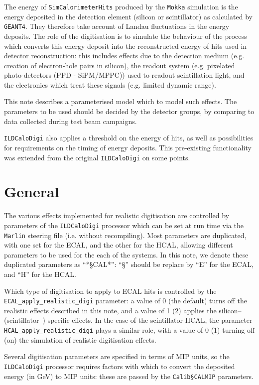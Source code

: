 \documentclass[12pt]{article} %
\begin{document}
The energy of {\tt SimCalorimeterHits} produced by the {\tt Mokka} simulation is the energy deposited in the detection
element (silicon or scintillator) as calculated by {\tt GEANT4}. They therefore take account of Landau fluctuations
in the energy deposits.
The role of the digitisation is to simulate the behaviour of the process which converts this energy deposit into the 
reconstructed energy of hits used in detector reconstruction: this includes effects due to the detection medium
(e.g. creation of electron-hole pairs in silicon), 
the readout system (e.g. pixelated photo-detectors (PPD - SiPM/MPPC)) used to readout scintillation light,
and the electronics which treat these signals (e.g. limited dynamic range).

This note describes a parameterised model which to model such effects. The parameters to be used should be decided by
the detector groups, by comparing to data collected during test beam campaigns.

{\tt ILDCaloDigi} also applies a threshold on the energy of hits, as well as possibilities for requirements on the timing
of energy deposits. This pre-existing functionality was extended from the original {\tt ILDCaloDigi} on some points.

\section{General}

The various effects implemented for realistic digitisation are controlled by parameters of the {\tt ILDCaloDigi}
processor which can be set at run time via the {\tt Marlin} steering file (i.e. without recompiling).
Most parameters are duplicated, with one set for the ECAL, and the other for the HCAL, allowing different
parameters to be used for the each of the systems. In this note, we denote these duplicated parameters as ``*\S CAL*'':
``\S'' should be replace by ``E'' for the ECAL, and ``H'' for the HCAL.

Which type of digitisation to apply to ECAL hits is controlled by the {\tt ECAL\_apply\_realistic\_digi} parameter: a value of
0 (the default) turns off the realistic effects described in this note, and a value of 1 (2) applies the silicon--
(scintillator--) specific effects. 
In the case of the scintillator HCAL, the parameter {\tt HCAL\_apply\_realistic\_digi}
plays a similar role, with a value of 0 (1) turning off (on) the simulation of realistic digitisation effects.

Several digitisation parameters are specified in terms of MIP units, so the {\tt ILDCaloDigi} processor requires 
factors with which to convert the deposited energy (in GeV) to MIP units: these are passed by the {\tt Calib\S CALMIP} parameters.
\end{document}
